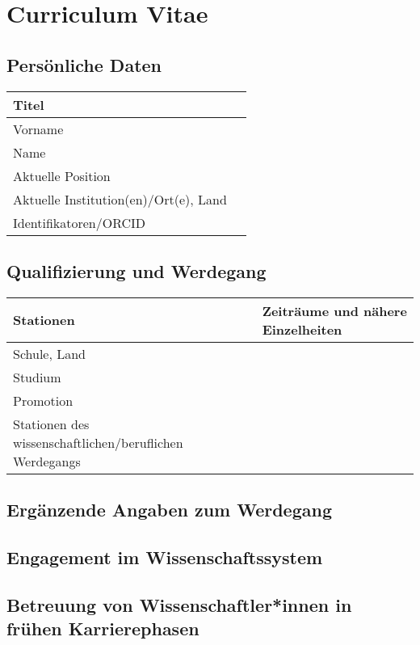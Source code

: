 \documentclass{scrartcl}
\begin{document}
\section*{Curriculum Vitae}

\subsection*{Persönliche Daten}

\begin{tabular}{|>{\raggedright}p{}|p{}|}
\hline
Titel & \\
\hline
Vorname & \\
\hline
Name & \\
\hline
Aktuelle Position &  \\
\hline
Aktuelle Institution(en)/Ort(e), Land & \\
\hline
Identifikatoren/ORCID & \\
\hline
\end{tabular}

\subsection*{Qualifizierung und Werdegang}

\begin{tabular}{|>{\raggedright}p{}|p{}|}
\hline
\textbf{Stationen} & \textbf{Zeiträume und nähere Einzelheiten} \\
\hline
Schule, Land & \\ %
\hline
Studium & \\
\hline
Promotion & \\
\hline
Stationen des wissenschaftlichen/beruflichen Werdegangs & \\ %
\hline
\end{tabular}

\subsection*{Ergänzende Angaben zum Werdegang}

\subsection*{Engagement im Wissenschaftssystem}

\subsection*{Betreuung von Wissenschaftler*innen in frühen Karrierephasen}
\end{document}
